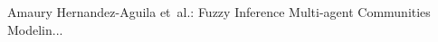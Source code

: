 \documentclass[12pt,journal,draftcls,onecolumn]{IEEEtran}
\begin{document}
% 
%



%
{Amaury Hernandez-Aguila {et~al.}: Fuzzy Inference Multi-agent Communities Modelin...}
% 



\end{document}
